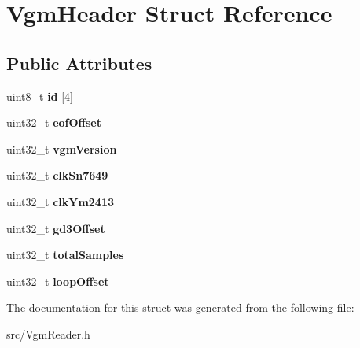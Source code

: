 \hypertarget{structVgmHeader}{}\section{Vgm\+Header Struct Reference}
\label{structVgmHeader}
\subsection*{Public Attributes}
\begin{DoxyCompactItemize}
\item 
\mbox{\label{structVgmHeader_a5a7ce06eb0299cdc87a404033726a173}} 
uint8\+\_\+t {\bfseries id} \mbox{[}4\mbox{]}
\item 
\mbox{\label{structVgmHeader_ab085eaf1591bd6a71225d542bd4d8338}} 
uint32\+\_\+t {\bfseries eof\+Offset}
\item 
\mbox{\label{structVgmHeader_ace2599569b7b7e44674a6d7b69e240bb}} 
uint32\+\_\+t {\bfseries vgm\+Version}
\item 
\mbox{\label{structVgmHeader_a133978250bc084e298b7da1030cd69db}} 
uint32\+\_\+t {\bfseries clk\+Sn7649}
\item 
\mbox{\label{structVgmHeader_a8c8a37b8781a26de28ca7c3c81ba54bc}} 
uint32\+\_\+t {\bfseries clk\+Ym2413}
\item 
\mbox{\label{structVgmHeader_a10988e646b5549a9cc8d6adcc27f8665}} 
uint32\+\_\+t {\bfseries gd3\+Offset}
\item 
\mbox{\label{structVgmHeader_a8eb90557c91b75cfb40a4bab036fc5f1}} 
uint32\+\_\+t {\bfseries total\+Samples}
\item 
\mbox{\label{structVgmHeader_af1d763c5bc9b8ab528cfea6869a8e9d4}} 
uint32\+\_\+t {\bfseries loop\+Offset}
\end{DoxyCompactItemize}


The documentation for this struct was generated from the following file\+:\begin{DoxyCompactItemize}
\item 
src/Vgm\+Reader.\+h\end{DoxyCompactItemize}
